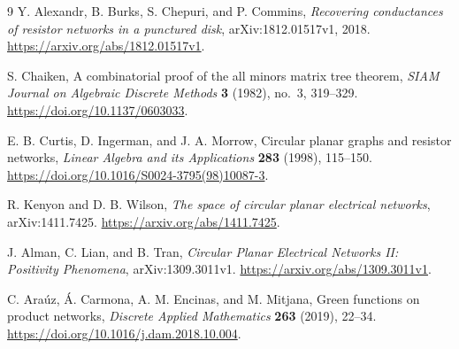 \documentclass[11pt]{article}
\theoremstyle{definition}
\begin{document}
\begin{thebibliography}{9}
Y. Alexandr, B. Burks, S. Chepuri, and P. Commins,
\emph{Recovering conductances of resistor networks in a punctured disk},
arXiv:1812.01517v1, 2018.
\url{https://arxiv.org/abs/1812.01517v1}.

S. Chaiken,
A combinatorial proof of the all minors matrix tree theorem,
\emph{SIAM Journal on Algebraic Discrete Methods} \textbf{3} (1982),
no.~3, 319--329.
\url{https://doi.org/10.1137/0603033}.

E. B. Curtis, D. Ingerman, and J. A. Morrow,
Circular planar graphs and resistor networks,
\emph{Linear Algebra and its Applications} \textbf{283} (1998), 115--150.
\url{https://doi.org/10.1016/S0024-3795(98)10087-3}.

R. Kenyon and D. B. Wilson,
\emph{The space of circular planar electrical networks},
arXiv:1411.7425.
\url{https://arxiv.org/abs/1411.7425}.

J. Alman, C. Lian, and B. Tran,
\emph{Circular Planar Electrical Networks II: Positivity Phenomena},
arXiv:1309.3011v1.
\url{https://arxiv.org/abs/1309.3011v1}.

C. Ara\'uz, \'A. Carmona, A. M. Encinas, and M. Mitjana,
Green functions on product networks,
\emph{Discrete Applied Mathematics} \textbf{263} (2019), 22--34.
\url{https://doi.org/10.1016/j.dam.2018.10.004}.
\end{thebibliography}
\end{document}
